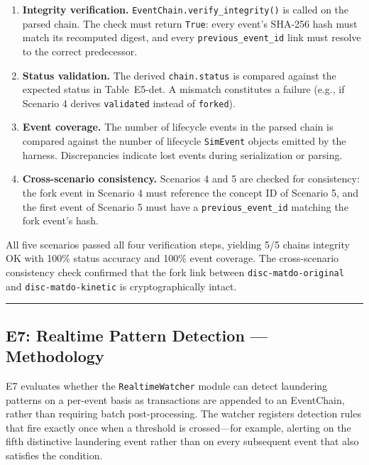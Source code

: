 \begin{enumerate}
\def\labelenumi{\arabic{enumi}.}
\item
  \textbf{Integrity verification.} \texttt{EventChain.verify\_integrity()} is called on the parsed chain. The check must return \texttt{True}: every event's SHA-256 hash must match its recomputed digest, and every \texttt{previous\_event\_id} link must resolve to the correct predecessor.
\item
  \textbf{Status validation.} The derived \texttt{chain.status} is compared against the expected status in Table~E5-det. A mismatch constitutes a failure (e.g., if Scenario 4 derives \texttt{validated} instead of \texttt{forked}).
\item
  \textbf{Event coverage.} The number of lifecycle events in the parsed chain is compared against the number of lifecycle \texttt{SimEvent} objects emitted by the harness. Discrepancies indicate lost events during serialization or parsing.
\item
  \textbf{Cross-scenario consistency.} Scenarios 4 and 5 are checked for consistency: the fork event in Scenario 4 must reference the concept ID of Scenario 5, and the first event of Scenario 5 must have a \texttt{previous\_event\_id} matching the fork event's hash.
\end{enumerate}

All five scenarios passed all four verification steps, yielding 5/5 chains integrity OK with 100\% status accuracy and 100\% event coverage. The cross-scenario consistency check confirmed that the fork link between \texttt{disc-matdo-original} and \texttt{disc-matdo-kinetic} is cryptographically intact.

\begin{center}\rule{0.5\linewidth}{0.5pt}\end{center}

\subsection{E7: Realtime Pattern Detection --- Methodology}\label{e7-realtime-pattern-detection-methodology}

E7 evaluates whether the \texttt{RealtimeWatcher} module can detect laundering patterns on a per-event basis as transactions are appended to an EventChain, rather than requiring batch post-processing. The watcher registers detection rules that fire exactly once when a threshold is crossed---for example, alerting on the fifth distinctive laundering event rather than on every subsequent event that also satisfies the condition.

